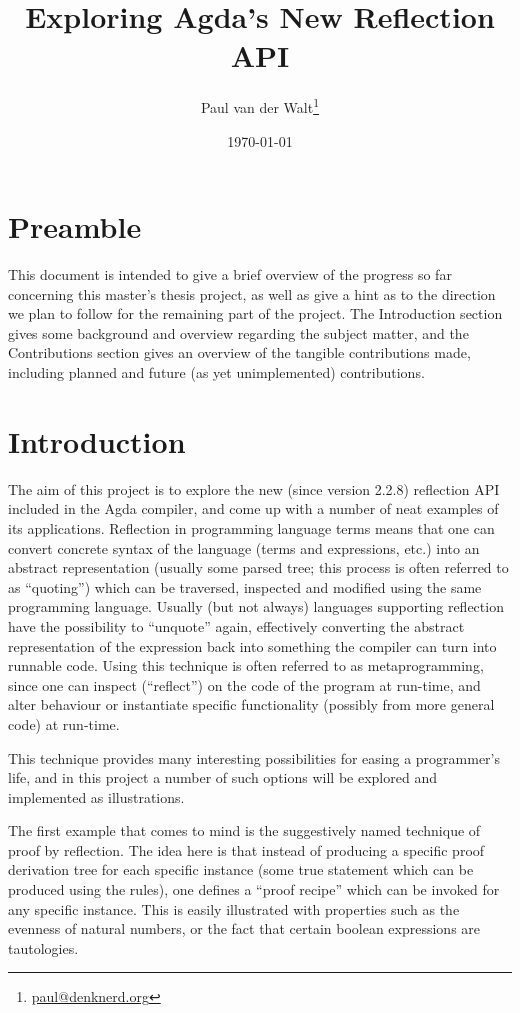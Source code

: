 \documentclass[a4paper]{article}
\author{Paul van der Walt\footnote{\url{paul@denknerd.org}}}
\date{\today}
\title{Exploring Agda's New Reflection API}
\begin{document}
\maketitle


\section{Preamble}

This document is intended to give a brief overview of the progress so far concerning
this master's thesis project, as well as give a hint as to the direction we plan to follow
for the remaining part of the project. The Introduction section gives some background and
overview regarding the subject matter, and the Contributions section gives an overview of
the tangible contributions made, including planned and future (as yet unimplemented) contributions.



\section{Introduction}


The aim of this project is to explore the new (since version 2.2.8) reflection API included in the Agda
compiler, and come up with a number of neat examples of its applications. Reflection in programming language
terms means that one can convert concrete syntax of the language (terms and expressions, etc.) into an abstract
representation (usually some parsed tree; this process is often referred to as ``quoting'')
which can be traversed, inspected and modified using the same programming
language. Usually (but not always) languages supporting reflection have the possibility to
``unquote'' again, effectively
converting the abstract representation of the expression back into something the compiler
can turn into runnable code. Using this technique is often referred to as metaprogramming,
since one can inspect (``reflect'') on the code of the program at run-time, and alter behaviour
or instantiate specific functionality (possibly from more general code) at run-time.


This technique provides many interesting possibilities for easing a programmer's life, and in
this project a number of such options will be explored and implemented as illustrations.



The first example that comes to mind
is the suggestively named technique of proof by reflection. The idea here is that instead of producing a specific
proof derivation tree for each specific instance (some true statement which can be produced using the rules), one
defines a ``proof recipe'' which can be invoked for any specific instance. This is easily illustrated with properties
such as the evenness of natural numbers, or the fact that certain boolean expressions are tautologies.
\end{document}
